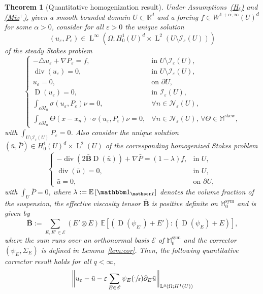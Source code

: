\documentclass[JEP,XML,SOM,Unicode,published]{cedram}
\let\mathcal\mathscr
\newcommand{\Hd}{\hyperref[Hd]{\textup{(H$_\delta$)}}\xspace}
\newcommand{\Mix}{\hyperref[Mix+]{\textup{(Mix$^+$)}}\xspace}
\let\mathds\mathbbm
\theoremstyle{plain}
\newtheorem{theor1}{Theorem}
\theoremstyle{definition}
\newcommand{\e}{\varepsilon}
\newcommand{\Ec}{\mathcal E}
\newcommand{\R}{\mathbb R}
\newcommand{\Ic}{\mathcal I}
\newcommand{\Md}{\mathbb M}
\newcommand{\Nc}{\mathcal N}
\newcommand{\D}{\operatorname{D}}
\newcommand{\Bb}{\bar{\boldsymbol B}}
\newcommand{\Ld}{\operatorname{L}}
\newcommand{\Div}{{\operatorname{div}}}
\newcommand{\Sym}{{\operatorname{sym}}}
\newcommand{\Skew}{{\operatorname{skew}}}
\newcommand{\expec}[1]{\mathbb{E}\left[ #1 \right]}
\begin{document}
\begin{theor1}[Quantitative homogenization result]\label{th:hom-quant}
Under Assumptions~\emph{\Hd} and \emph{\Mix},
given a smooth bounded domain $U\subset\R^d$ and a forcing $f\in W^{1+\alpha,\infty}(U)^d$ for some $\alpha>0$, consider for all $\e>0$ the unique solution
\[
(u_\e,P_\e)\in\Ld^\infty(\Omega;H^1_0(U)^d\times\Ld^2(U\setminus\Ic_\e(U)))
\]
of the steady Stokes problem
\begin{equation}\label{eq:Stokes}
\begin{cases}
-\triangle u_\e+\nabla P_\e=f,&\text{in $U\setminus\Ic_\e(U)$},\\
\Div (u_\e)=0,&\text{in $U\setminus\Ic_\e(U)$},\\
u_\e=0,&\text{on $\partial U$},\\
\D(u_\e)=0,&\text{in $\Ic_\e(U)$},\\
\int_{\e\partial I_n}\sigma(u_\e,P_\e)\nu=0,&\forall n\in\Nc_\e(U),\\
\int_{\e\partial I_n}\Theta(x-x_n)\cdot\sigma(u_\e,P_\e)\nu=0,&\forall n\in\Nc_\e(U),\,\forall\Theta\in\Md^\Skew,
\end{cases}
\end{equation}
with $\int_{U\setminus\Ic_\e(U)}P_\e=0$.
Also consider the unique solution $(\bar u,\bar P)\in H^1_0(U)^d\times\Ld^2(U)$ of the corresponding homogenized Stokes problem
\begin{equation}\label{eq:Stokes-hom}
\begin{cases}
-\Div(2\Bb \D(\bar u))+\nabla\bar P=(1-\lambda) f ,&\text{in $U$},\\
\Div(\bar u)=0,&\text{in $U$},\\
\bar u=0,&\text{on $\partial U$},
\end{cases}
\end{equation}
with $\int_U\bar P=0$,
where $\lambda:=\expec{\mathds 1_{\Ic}}$ denotes the volume fraction of the suspension, the effective viscosity tensor $\Bb$ is positive definite on $\Md_0^\Sym$ and is given by
\begin{equation}\label{eq:def-B}
\Bb:= \sum_{E,E'\in\Ec}(E'\otimes E)\,\expec{(\D(\psi_{E'})+E'):(\D(\psi_{E})+E)},
\end{equation}
where the sum runs over an orthonormal basis $\Ec$ of $\Md_0^\Sym$ and the corrector $(\psi_E,\Sigma_E)$ is defined in Lemma~\ref{lem:cor}.
Then,
the following quantitative corrector result holds for all $q<\infty$,
\begin{multline}\label{eq:hom-quant0}
\bigg\|u_\e-\bar u-\e\sum_{E\in\Ec}\psi_E(\sfrac\cdot\e)\partial_E\bar u\bigg\|_{\Ld^q(\Omega;H^1(U))}\\

\end{multline}
\end{theor1}
\end{document}
